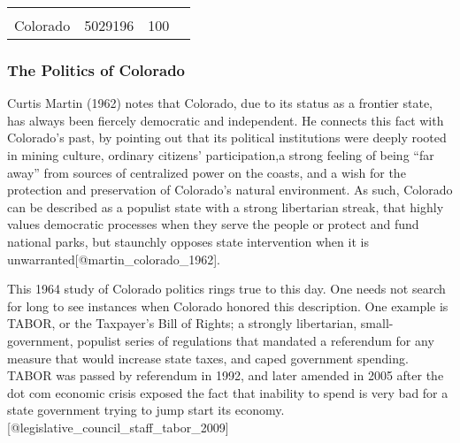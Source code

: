 \documentclass[]{article}
\begin{document}
\begin{longtable}[]{@{}lccl@{}}
\begin{minipage}[t]{0.34\columnwidth}
\strut
\end{minipage}\tabularnewline
\begin{minipage}[t]{0.13\columnwidth}\raggedright\strut
Colorado\strut
\end{minipage} & \begin{minipage}[t]{0.21\columnwidth}\centering\strut
5029196\strut
\end{minipage} & \begin{minipage}[t]{0.20\columnwidth}\centering\strut
100\strut
\end{minipage} & \begin{minipage}[t]{0.34\columnwidth}\raggedright\strut
\strut
\end{minipage}\tabularnewline
\bottomrule
\end{longtable}

\clearpage

\subsubsection{The Politics of Colorado}\label{the-politics-of-colorado}

Curtis Martin (1962) notes that Colorado, due to its status as a
frontier state, has always been fiercely democratic and independent. He
connects this fact with Colorado's past, by pointing out that its
political institutions were deeply rooted in mining culture, ordinary
citizens' participation,a strong feeling of being ``far away'' from
sources of centralized power on the coasts, and a wish for the
protection and preservation of Colorado's natural environment. As such,
Colorado can be described as a populist state with a strong libertarian
streak, that highly values democratic processes when they serve the
people or protect and fund national parks, but staunchly opposes state
intervention when it is unwarranted{[}@martin\_colorado\_1962{]}.

This 1964 study of Colorado politics rings true to this day. One needs
not search for long to see instances when Colorado honored this
description. One example is TABOR, or the Taxpayer's Bill of Rights; a
strongly libertarian, small-government, populist series of regulations
that mandated a referendum for any measure that would increase state
taxes, and caped government spending. TABOR was passed by referendum in
1992, and later amended in 2005 after the dot com economic crisis
exposed the fact that inability to spend is very bad for a state
government trying to jump start its economy.
{[}@legislative\_council\_staff\_tabor\_2009{]}
\end{document}
